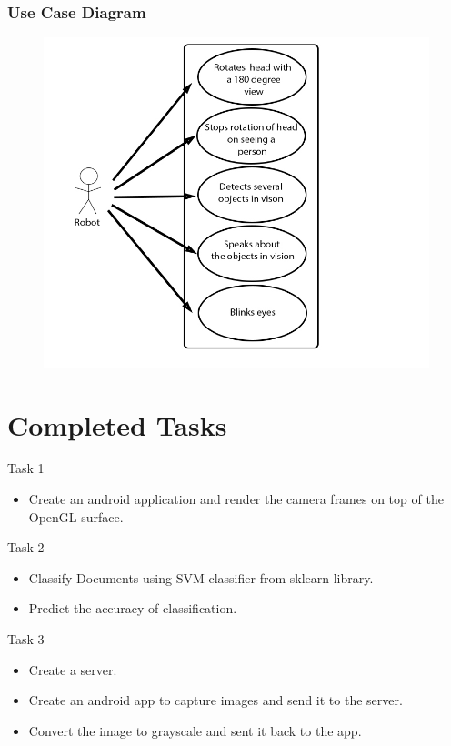 \documentclass{beamer}
\begin{document}
\begin{frame}
	\frametitle{Use Case Diagram}
	\begin{figure}
		\begin{center}
			\includegraphics[scale=1.0]{usecase.jpg}
		\end{center}
	\end{figure}
\end{frame}

\section{Completed Tasks}
\begin{frame}{Task 1}
\begin{itemize}
  \item Create an android application and render the camera frames on top of the OpenGL surface.
\end{itemize}
\end{frame}

\begin{frame}{Task 2}
\begin{itemize}
  \item Classify Documents using SVM classifier from sklearn library.
  \item Predict the accuracy of classification.
\end{itemize}
\end{frame}


\begin{frame}{Task 3}
\begin{itemize}
  \item Create a server.
  \item Create an android app to capture images and send it to the server.
  \item Convert the image to grayscale and sent it back to the app.
\end{itemize}
\end{frame}
\end{document}
